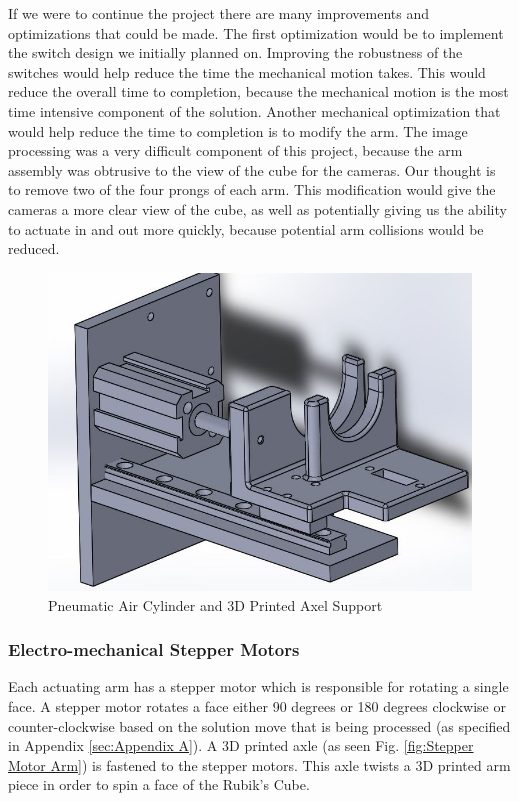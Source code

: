\documentclass[final, letterpaper, 10 pt, conference, twocolumn]{IEEEtran}
\begin{document}
If we were to continue the project there are many improvements and optimizations that could be made. The first optimization would be to implement the switch design we initially planned on.  Improving the robustness of the switches would help reduce the time the mechanical motion takes. This would reduce the overall time to completion, because the mechanical motion is the most time intensive component of the solution. 
Another mechanical optimization that would help reduce the time to completion is to modify the arm.  The image processing was a very difficult component of this project, because the arm assembly was obtrusive to the view of the cube for the cameras.  Our thought is to remove two of the four prongs of each arm.  This modification would give the cameras a more clear view of the cube, as well as potentially giving us the ability to actuate in and out more quickly, because potential arm collisions would be reduced.

\begin{figure}[!ht]
\centering
\includegraphics[scale=0.28]{AirCylinder.jpg}
\caption{Pneumatic Air Cylinder and 3D Printed Axel Support}
\label{fig:Pneumatic Air Cylinder}
\end{figure}

\subsubsection{Electro-mechanical Stepper Motors}
\label{sec:Stepper Motors}
Each actuating arm has a stepper motor which is responsible for rotating a single face. A stepper motor rotates a face either 90 degrees or 180 degrees clockwise or counter-clockwise based on the solution move that is being processed (as specified in Appendix \ref{sec:Appendix A}). A 3D printed axle (as seen Fig. \ref{fig:Stepper Motor Arm}) is fastened to the stepper motors. This axle twists a 3D printed arm piece in order to spin a face of the Rubik's Cube.
\end{document}
